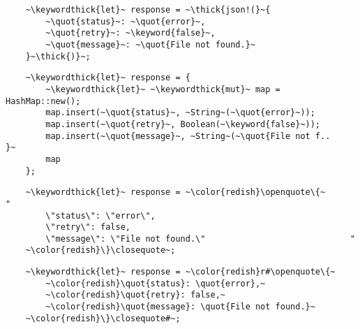 \documentclass[usepdftitle=false,aspectratio=169]{beamer}
\newcommand{\thick}[1]{\contourlength{0.16pt}\contour[10]{black}{#1}}
\newcommand{\slantbox}[2][.5]
  {%
    \mbox
      {%
        \sbox{\foobox}{#2}%
        \hskip\wd\foobox
        \pdfsave
        \pdfsetmatrix{1 0 #1 1}%
        \llap{\usebox{\foobox}}%
        \pdfrestore
      }%
  }
\newcommand{\backslantbox}[2][.5]
  {%
    \mbox
      {%
        \sbox{\foobox}{#2}%
        \hskip\wd\foobox
        \pdfsave
        \pdfsetmatrix{-1 0 #1 1}%
        \llap{\usebox{\foobox}}%
        \pdfrestore
      }%
  }
\newcommand{\openquote}{\backslantbox[.2]{\hspace{11pt}''\hspace{-11pt}}}
\newcommand{\closequote}{\slantbox[-.2]{\hspace{2pt}''\hspace{-2pt}}}
\newcommand{\blackquote}[1]{\openquote#1\closequote}
\newcommand{\quot}[1]{{\color{redish}\blackquote{#1}}}
\newcommand{\keyword}[1]{\color{greenish}#1}
\newcommand{\keywordthick}[1]{\color{greenish}\contourlength{0.20pt}\contour[10]{greenish}{#1}}
\begin{document}
\begin{frame}[fragile]
  \begin{verbatim}
    ~\keywordthick{let}~ response = ~\thick{json!(}~{
        ~\quot{status}~: ~\quot{error}~,
        ~\quot{retry}~: ~\keyword{false}~,
        ~\quot{message}~: ~\quot{File not found.}~
    }~\thick{)}~;
  \end{verbatim}
\end{frame}

\begin{frame}[fragile]
  \begin{verbatim}
    ~\keywordthick{let}~ response = {
        ~\keywordthick{let}~ ~\keywordthick{mut}~ map = HashMap::new();
        map.insert(~\quot{status}~, ~String~(~\quot{error}~));
        map.insert(~\quot{retry}~, Boolean(~\keyword{false}~));
        map.insert(~\quot{message}~, ~String~(~\quot{File not f..     }~
        map
    };
  \end{verbatim}
\end{frame}

\begin{frame}[fragile]
  \begin{verbatim}
    ~\keywordthick{let}~ response = ~\color{redish}\openquote\{~                                "
        \"status\": \"error\",
        \"retry\": false,
        \"message\": \"File not found.\"                             "
    ~\color{redish}\}\closequote~;
  \end{verbatim}
\end{frame}

\begin{frame}[fragile]
  \begin{verbatim}
    ~\keywordthick{let}~ response = ~\color{redish}r#\openquote\{~
        ~\color{redish}\quot{status}: \quot{error},~
        ~\color{redish}\quot{retry}: false,~
        ~\color{redish}\quot{message}: \quot{File not found.}~
    ~\color{redish}\}\closequote#~;
  \end{verbatim}
\end{frame}
\end{document}
